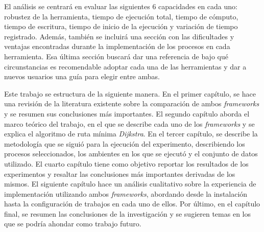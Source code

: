 El análisis se centrará en evaluar las siguientes 6 capacidades en cada uno: robustez de la herramienta, tiempo de ejecución total, tiempo de cómputo, tiempo de escritura, tiempo de inicio de la ejecución y variación de tiempo registrado. Además, también se incluirá una sección con las dificultades y ventajas encontradas durante la implementación de los procesos en cada herramienta. Esa última sección buscará dar una referencia de bajo qué circunstancias es recomendable adoptar cada una de las herramientas y dar a nuevos usuarios una guía para elegir entre ambas. 

Este trabajo se estructura de la siguiente manera. En el primer capítulo, se hace una revisión de la literatura existente sobre la comparación de ambos \textit{frameworks} y se resumen sus conclusiones más importantes. El segundo capítulo aborda el marco teórico del trabajo, en el que se describe cada uno de los \textit{frameworks} y se explica el algoritmo de ruta mínima \textit{Dijkstra}. En el tercer capítulo, se describe la metodología que se siguió para la ejecución del experimento, describiendo los procesos seleccionados, los ambientes en los que se ejecutó y el conjunto de datos utilizado. El cuarto capítulo tiene como objetivo reportar los resultados de los experimentos y resaltar las conclusiones más importantes derivadas de los mismos. El siguiente capítulo hace un análisis cualitativo sobre la experiencia de implementación utilizando ambos \textit{frameworks}, abordando desde la instalación hasta la configuración de trabajos en cada uno de ellos. Por último, en el capítulo final, se resumen las conclusiones de la investigación y se sugieren temas en los que se podría ahondar como trabajo futuro.

